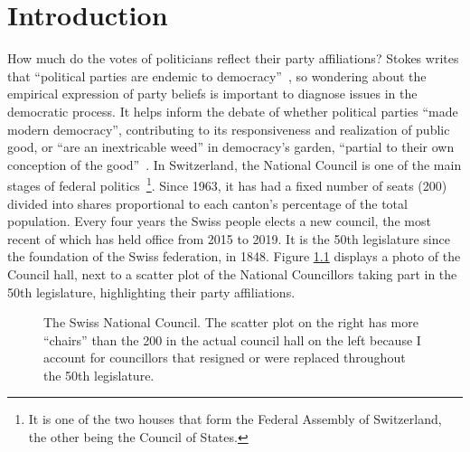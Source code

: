 \chapter{Introduction}\label{ch:intro}


How much do the votes of politicians reflect their party affiliations? Stokes writes that ``political parties are endemic to democracy''~\cite[p.245]{stokes1999}, so wondering about the empirical expression of party beliefs is important to diagnose issues in the democratic process. It helps inform the debate of whether political parties ``made modern democracy'', contributing to its responsiveness and realization of public good, or ``are an inextricable weed'' in democracy's garden, ``partial to their own conception of the good''~\cite[pp.263--264]{stokes1999}. In Switzerland, the National Council is one of the main stages of federal politics~\footnote{It is one of the two houses that form the Federal Assembly of Switzerland, the other being the Council of States.}. Since 1963, it has had a fixed number of seats (200) divided into shares proportional to each canton's percentage of the total population. Every four years the Swiss people elects a new council, the most recent of which has held office from 2015 to 2019. It is the 50th legislature since the foundation of the Swiss federation, in 1848. Figure \ref{fig:snc_photo_and_parties} displays a photo of the Council hall, next to a scatter plot of the National Councillors taking part in the 50th legislature, highlighting their party affiliations.
\begin{figure}[H]
    \centering
    \hfill
    \caption[The Swiss National Council]{The Swiss National Council. The scatter plot on the right has more ``chairs'' than the 200 in the actual council hall on the left because I account for councillors that resigned or were replaced throughout the 50th legislature.}
    \label{fig:snc_photo_and_parties}
\end{figure}

